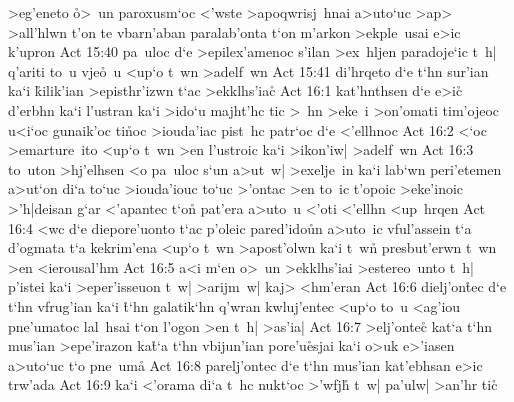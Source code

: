 >eg'eneto
\r{o}>~un
paroxusm`oc
<'wste
>apoqwrisj~hnai
a>uto`uc
>ap>
>all'hlwn
t'on
te
vbarn'aban
paralab'onta
t`on
m'arkon
>ekple~usai
e>ic
k'upron\bibvsend
\vs Act 15:40
pa~uloc
d`e
>epilex'amenoc
s'ilan
>ex~hljen
paradoje`ic
t~h|
q'ariti
to~u
vje\r{o}~u
<up`o
t~wn
>adelf~wn\bibvsend
\vs Act 15:41
di'hrqeto
d`e
t`hn
sur'ian
ka`i
\r{k}ilik'ian
>episthr'izwn
t`ac
>ekklhs'ia\r{c}\bibvsend
{}
\vs Act 16:1
kat'hnthsen
d`e
e>ic\r{}
d'erbhn
ka`i
l'ustran
ka`i
>ido`u
majht'hc
tic
>~hn
>eke~i
>on'omati
tim'ojeoc
u<i`oc
gunaik'oc
ti\r{n}oc
>iouda'iac
pist~hc
patr`oc
d`e
<'ellhnoc\bibvsend
\vs Act 16:2
<`oc
>emarture~ito
<up`o
t~wn
>en
l'ustroic
ka`i
>ikon'iw|
>adelf~wn\bibvsend
\vs Act 16:3
to~uton
>hj'elhsen
<o
pa~uloc
s`un
a>ut~w|
>exelje~in
ka`i
lab`wn
peri'etemen
a>ut`on
di`a
to`uc
>iouda'iouc
to`uc
>'ontac
>en
to~ic
t'opoic
>eke'inoic
>'h|deisan
g`ar
<'apantec
t`on\r{}
pat'era
a>uto~u
<'oti
<'ellhn
<up~hrqen\bibvsend
\vs Act 16:4
<wc
d`e
diepore'uonto
t`ac
p'oleic
pared'ido\r{u}n
a>uto~ic
vful'assein
t`a
d'ogmata
t`a
kekrim'ena
<up`o
t~wn
>apost'olwn
ka`i
t~wn\r{}
presbut'erwn
t~wn
>en
<ierousal'hm\bibvsend
\vs Act 16:5
a<i
m`en
o>~un
>ekklhs'iai
>estereo~unto
t~h|
p'istei
ka`i
>eper'isseuon
t~w|
>arijm~w|
kaj>
<hm'eran\bibvsend
\vs Act 16:6
dielj'on\r{t}ec
d`e
t`hn
vfrug'ian
ka`i
\r{t}`hn
galatik`hn
q'wran
kwluj'entec
<up`o
to~u
<ag'iou
pne'umatoc
lal~hsai
t`on
l'ogon
>en
t~h|
>as'ia|\bibvsend
\vs Act 16:7
>elj'onte\r{c}
kat`a
t`hn
mus'ian
>epe'irazon
ka\r{t}`a
t`hn
vbijun'ian
pore'u\r{e}sjai
ka`i
o>uk
e>'iasen
a>uto`uc
t`o
pne~um\r{a}\bibvsend
{}
\vs Act 16:8
parelj'ontec
d`e
t`hn
mus'ian
kat'ebhsan
e>ic
trw'ada\bibvsend
\vs Act 16:9
ka`i
<'orama
di`a
t~hc
nukt`oc
>'wfjh\r{}
t~w|
pa'ulw|
>an'hr
tic\r{}
